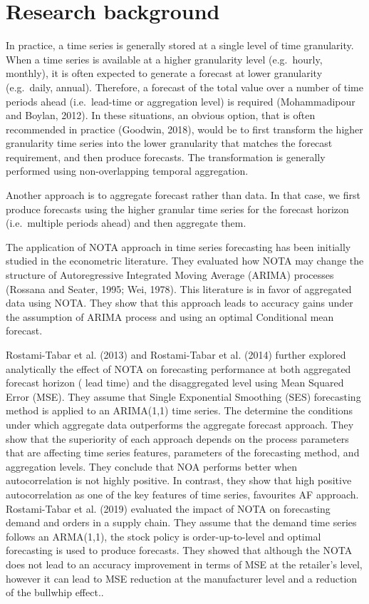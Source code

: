 \documentclass[]{elsarticle} %
\begin{document}
\hypertarget{lit}{%
\section{Research background}\label{lit}}

In practice, a time series is generally stored at a single level of time
granularity. When a time series is available at a higher granularity
level (e.g.~hourly, monthly), it is often expected to generate a
forecast at lower granularity (e.g.~daily, annual). Therefore, a
forecast of the total value over a number of time periods ahead
(i.e.~lead-time or aggregation level) is required (Mohammadipour and
Boylan, 2012). In these situations, an obvious option, that is often
recommended in practice (Goodwin, 2018), would be to first transform the
higher granularity time series into the lower granularity that matches
the forecast requirement, and then produce forecasts. The transformation
is generally performed using non-overlapping temporal aggregation.

Another approach is to aggregate forecast rather than data. In that
case, we first produce forecasts using the higher granular time series
for the forecast horizon (i.e.~multiple periods ahead) and then
aggregate them.

The application of NOTA approach in time series forecasting has been
initially studied in the econometric literature. They evaluated how NOTA
may change the structure of Autoregressive Integrated Moving Average
(ARIMA) processes (Rossana and Seater, 1995; Wei, 1978). This literature
is in favor of aggregated data using NOTA. They show that this approach
leads to accuracy gains under the assumption of ARIMA process and using
an optimal Conditional mean forecast.

Rostami-Tabar et al. (2013) and Rostami-Tabar et al. (2014) further
explored analytically the effect of NOTA on forecasting performance at
both aggregated forecast horizon ( lead time) and the disaggregated
level using Mean Squared Error (MSE). They assume that Single
Exponential Smoothing (SES) forecasting method is applied to an
ARIMA(1,1) time series. The determine the conditions under which
aggregate data outperforms the aggregate forecast approach. They show
that the superiority of each approach depends on the process parameters
that are affecting time series features, parameters of the forecasting
method, and aggregation levels. They conclude that NOA performs better
when autocorrelation is not highly positive. In contrast, they show that
high positive autocorrelation as one of the key features of time series,
favourites AF approach. Rostami-Tabar et al. (2019) evaluated the impact
of NOTA on forecasting demand and orders in a supply chain. They assume
that the demand time series follows an ARMA(1,1), the stock policy is
order-up-to-level and optimal forecasting is used to produce forecasts.
They showed that although the NOTA does not lead to an accuracy
improvement in terms of MSE at the retailer's level, however it can lead
to MSE reduction at the manufacturer level and a reduction of the
bullwhip effect..
\end{document}
